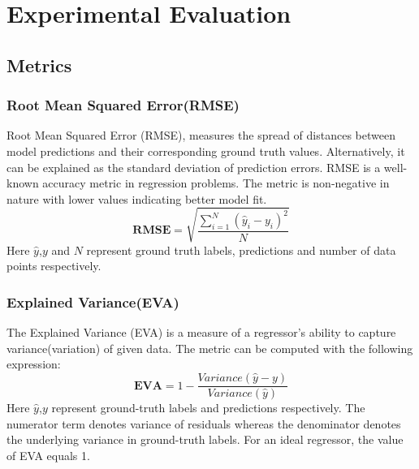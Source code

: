 

    \chapter{Experimental Evaluation}
\section{Metrics}
\subsection{Root Mean Squared Error(RMSE)}
Root Mean Squared Error (RMSE), measures the spread of distances between model predictions and their corresponding ground truth values. Alternatively, it can be explained as the standard deviation of prediction errors. RMSE is a well-known accuracy metric in regression problems. The metric is non-negative in nature with lower values indicating better model fit.
\begin{equation}
	\mathbf{RMSE} = \sqrt{\frac{\sum_{i=1}^{N}(\hat{y}_i-y_i)^2}{N}}
\end{equation}
Here $\hat{y}$,$y$ and $N$ represent ground truth labels, predictions and number of data points respectively.
\subsection{Explained Variance(EVA)}
The Explained Variance (EVA) is a measure of a regressor's ability to capture variance(variation) of given data. The metric can be computed with the following expression:
\begin{equation}
	\mathbf{EVA} = 1-\frac{Variance(\hat{y}-y)}{Variance(\hat{y})}
\end{equation}
Here $\hat{y}$,$y$ represent ground-truth labels and predictions respectively. The numerator term denotes variance of residuals whereas the denominator denotes the underlying variance in ground-truth labels. For an ideal regressor, the value of EVA equals 1.
